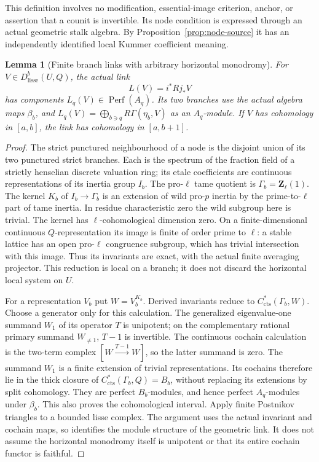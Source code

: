 \documentclass[11pt]{article}
\newtheorem{lemma}[theorem]{Lemma}
\theoremstyle{definition}
\theoremstyle{remark}
\newcommand{\Perf}{\operatorname{Perf}}
\begin{document}
This definition involves no modification, essential-image criterion,
anchor, or assertion that a counit is invertible.  Its node condition
is expressed through an actual geometric stalk algebra.  By
Proposition~\ref{prop:node-source} it has an independently identified
local Kummer coefficient meaning.

\begin{lemma}[Finite branch links with arbitrary horizontal monodromy]
\label{lem:finite-horizontal-links}
For $V\in D^b_{\mathrm{lisse}}(U,Q)$, the actual link
\[
 L(V)=i^*Rj_*V
\]
has components $L_q(V)\in\Perf(A_q)$.  Its two branches use the
actual algebra maps $\beta_b$, and
$L_q(V)=\bigoplus_{b\ni q}R\Gamma(\eta_b,V)$ as an $A_q$-module.
If $V$ has cohomology in $[a,b]$, the link has cohomology in
$[a,b+1]$.
\end{lemma}
\begin{proof}
The strict punctured neighbourhood of a node is the disjoint union
of its two punctured strict branches.  Each is the spectrum of the
fraction field of a strictly henselian discrete valuation ring;
its etale coefficients are continuous representations of its
inertia group $I_b$.  The pro-$\ell$ tame quotient is
$\Gamma_b=\mathbf Z_\ell(1)$.  The kernel $K_b$ of
$I_b\to\Gamma_b$ is an extension of wild pro-$p$ inertia by the
prime-to-$\ell$ part of tame inertia.  In residue characteristic zero the wild subgroup here is trivial.
The kernel has $\ell$-cohomological dimension zero.  On a finite-dimensional continuous $Q$-representation
its image is finite of order prime to $\ell$: a stable lattice has
an open pro-$\ell$ congruence subgroup, which has trivial intersection
with this image.  Thus its invariants are exact, with the actual
finite averaging projector.  This reduction is local on a branch;
it does not discard the horizontal local system on $U$.

For a representation $V_b$ put $W=V_b^{K_b}$.  Derived invariants
reduce to $C^*_{\mathrm{cts}}(\Gamma_b,W)$.  Choose a generator only
for this calculation.  The generalized eigenvalue-one summand $W_1$
of its operator $T$ is unipotent; on the complementary rational
primary summand $W_{\ne1}$, $T-1$ is invertible.  The continuous
cochain calculation is the two-term complex $[W\xrightarrow{T-1}W]$,
so the latter summand is zero.  The summand $W_1$ is a finite extension
of trivial representations.  Its cochains therefore lie in the thick
closure of $C^*_{\mathrm{cts}}(\Gamma_b,Q)=B_b$, without replacing
its extensions by split cohomology.  They are perfect $B_b$-modules,
and hence perfect $A_q$-modules under $\beta_b$.
This also proves the cohomological interval.  Apply finite Postnikov
triangles to a bounded lisse complex.  The argument uses the actual
invariant and cochain maps, so identifies the module structure of the
geometric link.  It does not assume the horizontal monodromy itself
is unipotent or that its entire cochain functor is faithful.
\end{proof}
\end{document}

